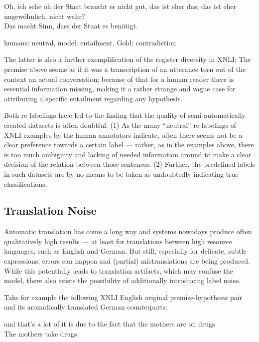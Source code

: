 {\begin{examples}
  \item Oh, ich sehe oh der Staat braucht es nicht gut, das ist eher das, das ist eher ungewöhnlich, nicht wahr?\\
        Das macht Sinn, dass der Staat es benötigt.

        humans: neutral, model: entailment, Gold: contradiction
\end{examples}

The latter is also a further exemplification of the register diversity in XNLI: The premise above seems as if it
was a transcription of an utterance torn out of the context an actual conversation; because of that for a human
reader there is essential information missing, making it a rather strange and vague case for attributing
a specific entailment regarding any hypothesis.


Both re-labelings have led to the finding that the quality of semi-automatically
created datasets is often doubtful: (1) As the many ``neutral'' re-labelings of
XNLI examples by the human annotators indicate, often there seems not be a clear
preference towards a certain label --- rather, as in the examples above, there is
too much ambiguity and lacking of needed information around to make a clear decision
of the relation between those sentences. (2) Further, the predefined labels in such
datasets are by no means to be taken as undoubtedly indicating true classifications.



\subsection{Translation Noise}
\label{sec:translation-noise}

Automatic translation has come a long way and systems nowadays produce often qualitatively
high results --- at least for translations between high resource languages, such as English
and German. But still, especially for delicate, subtle expressions, errors can happen and
(partial) mistranslations are being produced. While this potentially leads to translation
artifacts, which may confuse the model, there also exists the possibility of additionally
introducing label noise.

Take for example the following XNLI English original premise-hypothesis pair and its aromatically
translated German counterparts:

\begin{examples}
  \item and that's a lot of it is due to the fact that the mothers are on drugs\\
        The mothers take drugs.


\end{examples}}
